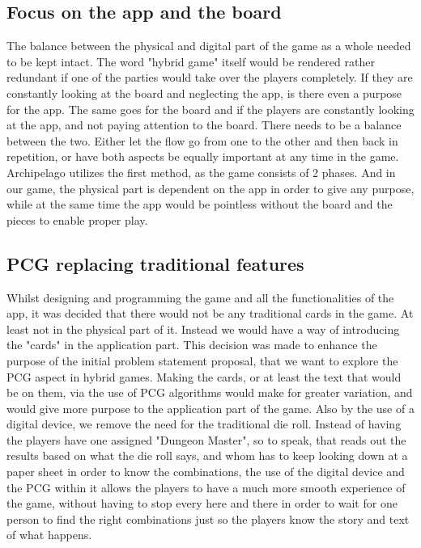 \subsection{Focus on the app and the board}
The balance between the physical and digital part of the game as a whole needed to be kept intact. The word "hybrid game" itself would be rendered rather redundant if one of the parties would take over the players completely. If they are constantly looking at the board and neglecting the app, is there even a purpose for the app. The same goes for the board and if the players are constantly looking at the app, and not paying attention to the board. There needs to be a balance between the two. Either let the flow go from one to the other and then back in repetition, or have both aspects be equally important at any time in the game. Archipelago utilizes the first method, as the game consists of 2 phases. And in our game, the physical part is dependent on the app in order to give any purpose, while at the same time the app would be pointless without the board and the pieces to enable proper play.

\subsection{PCG replacing traditional features}
Whilst designing and programming the game and all the functionalities of the app, it was decided that there would not be any traditional cards in the game. At least not in the physical part of it. Instead we would have a way of introducing the "cards" in the application part. This decision was made to enhance the purpose of the initial problem statement proposal, that we want to explore the PCG aspect in hybrid games. Making the cards, or at least the text that would be on them, via the use of PCG algorithms would make for greater variation, and would give more purpose to the application part of the game. Also by the use of a digital device, we remove the need for the traditional die roll. Instead of having the players have one assigned "Dungeon Master", so to speak, that reads out the results based on what the die roll says, and whom has to keep looking down at a paper sheet in order to know the combinations, the use of the digital device and the PCG within it allows the players to have a much more smooth experience of the game, without having to stop every here and there in order to wait for one person to find the right combinations just so the players know the story and text of what happens.

